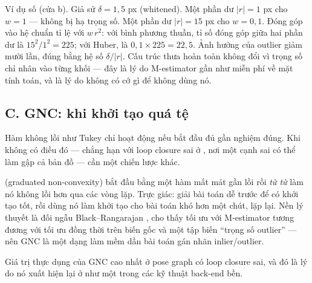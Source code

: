 \documentclass[../../vslam.tex]{subfiles}
\begin{document}
Ví dụ số (cửa b). Giả sử \(\delta = 1{,}5\) px (whitened). Một phần dư \(|r| = 1\) px cho \(w = 1\) --- không bị hạ trọng số. Một phần dư \(|r| = 15\) px cho \(w = 0{,}1\). Đóng góp vào hệ chuẩn tỉ lệ với \(w\,r^2\): với bình phương thuần, tỉ số đóng góp giữa hai phần dư là \(15^2/1^2 = 225\); với Huber, là \(0{,}1\times 225 = 22{,}5\). Ảnh hưởng của outlier giảm mười lần, đúng bằng hệ số \(\delta/|r|\). Cấu trúc thưa hoàn toàn không đổi vì trọng số chỉ nhân vào từng khối --- đây là lý do M-estimator gần như miễn phí về mặt tính toán, và là lý do không có cớ gì để không dùng nó.

\subsection{C. GNC: khi khởi tạo quá tệ}

Hàm không lồi như Tukey chỉ hoạt động nếu bắt đầu đủ gần nghiệm đúng. Khi không có điều đó --- chẳng hạn với loop closure sai ở , nơi một cạnh sai có thể làm gập cả bản đồ --- cần một chiến lược khác.

 (graduated non-convexity) \cite{yang2020gnc} bắt đầu bằng một hàm mất mát gần lồi rồi \emph{từ từ} làm nó không lồi hơn qua các vòng lặp. Trực giác: giải bài toán dễ trước để có khởi tạo tốt, rồi dùng nó làm khởi tạo cho bài toán khó hơn một chút, lặp lại. Nền lý thuyết là đối ngẫu Black--Rangarajan \cite{blackrangarajan1996}, cho thấy tối ưu với M-estimator tương đương với tối ưu đồng thời trên biến gốc và một tập biến ``trọng số outlier'' --- nên GNC là một dạng làm mềm dần bài toán gán nhãn inlier/outlier.

Giá trị thực dụng của GNC cao nhất ở pose graph có loop closure sai, và đó là lý do nó xuất hiện lại ở  như một trong các kỹ thuật back-end bền.

\begin{ungdung}
\end{ungdung}
\end{document}
